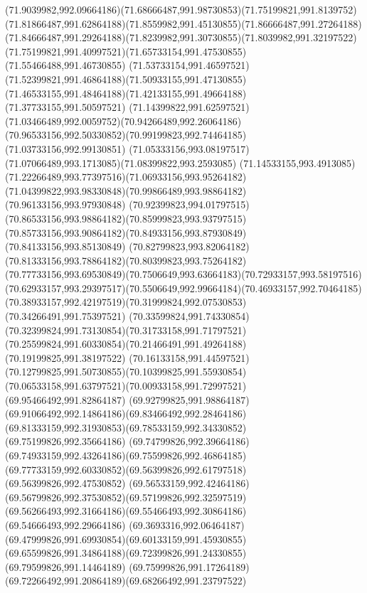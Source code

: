 {{  \curveto(71.9039982,992.09664186)(71.68666487,991.98730853)(71.75199821,991.8139752)
  \curveto(71.81866487,991.62864188)(71.8559982,991.45130855)(71.86666487,991.27264188)
  \curveto(71.84666487,991.29264188)(71.8239982,991.30730855)(71.8039982,991.32197522)
  \curveto(71.75199821,991.40997521)(71.65733154,991.47530855)(71.55466488,991.46730855)
  \curveto(71.53733154,991.46597521)(71.52399821,991.46864188)(71.50933155,991.47130855)
  \curveto(71.46533155,991.48464188)(71.42133155,991.49664188)(71.37733155,991.50597521)
  \curveto(71.14399822,991.62597521)(71.03466489,992.0059752)(70.94266489,992.26064186)
  \curveto(70.96533156,992.50330852)(70.99199823,992.74464185)(71.03733156,992.99130851)
  \curveto(71.05333156,993.08197517)(71.07066489,993.1713085)(71.08399822,993.2593085)
  \curveto(71.14533155,993.4913085)(71.22266489,993.77397516)(71.06933156,993.95264182)
  \curveto(71.04399822,993.98330848)(70.99866489,993.98864182)(70.96133156,993.97930848)
  \curveto(70.92399823,994.01797515)(70.86533156,993.98864182)(70.85999823,993.93797515)
  \curveto(70.85733156,993.90864182)(70.84933156,993.87930849)(70.84133156,993.85130849)
  \curveto(70.82799823,993.82064182)(70.81333156,993.78864182)(70.80399823,993.75264182)
  \curveto(70.77733156,993.69530849)(70.7506649,993.63664183)(70.72933157,993.58197516)
  \curveto(70.62933157,993.29397517)(70.5506649,992.99664184)(70.46933157,992.70464185)
  \curveto(70.38933157,992.42197519)(70.31999824,992.07530853)(70.34266491,991.75397521)
  \curveto(70.33599824,991.74330854)(70.32399824,991.73130854)(70.31733158,991.71797521)
  \curveto(70.25599824,991.60330854)(70.21466491,991.49264188)(70.19199825,991.38197522)
  \curveto(70.16133158,991.44597521)(70.12799825,991.50730855)(70.10399825,991.55930854)
  \curveto(70.06533158,991.63797521)(70.00933158,991.72997521)(69.95466492,991.82864187)
  \curveto(69.92799825,991.98864187)(69.91066492,992.14864186)(69.83466492,992.28464186)
  \curveto(69.81333159,992.31930853)(69.78533159,992.34330852)(69.75199826,992.35664186)
  \curveto(69.74799826,992.39664186)(69.74933159,992.43264186)(69.75599826,992.46864185)
  \curveto(69.77733159,992.60330852)(69.56399826,992.61797518)(69.56399826,992.47530852)
  \curveto(69.56533159,992.42464186)(69.56799826,992.37530852)(69.57199826,992.32597519)
  \curveto(69.56266493,992.31664186)(69.55466493,992.30864186)(69.54666493,992.29664186)
  \curveto(69.3693316,992.06464187)(69.47999826,991.69930854)(69.60133159,991.45930855)
  \curveto(69.65599826,991.34864188)(69.72399826,991.24330855)(69.79599826,991.14464189)
  \curveto(69.75999826,991.17264189)(69.72266492,991.20864189)(69.68266492,991.23797522)
}}
